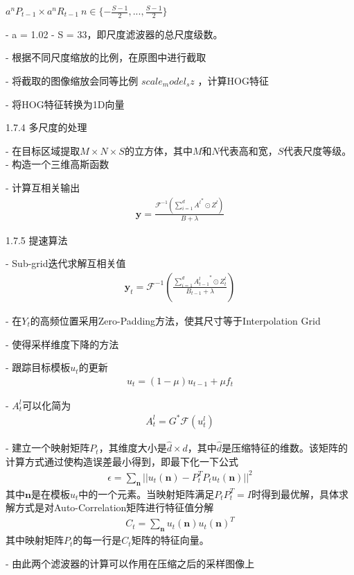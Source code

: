 $a^nP_{t-1}\times a^nR_{t-1}\ n \in \{-\frac{S-1}{2},...,\frac{S-1}{2}\} $

- a = 1.02
- S = 33，即尺度滤波器的总尺度级数。

- 根据不同尺度缩放的比例，在原图中进行截取

- 将截取的图像缩放会同等比例 $scale_model_sz$ ，计算HOG特征

- 将HOG特征转换为1D向量

1.7.4 多尺度的处理

- 在目标区域提取$M\times N \times S$的立方体，其中$M$和$N$代表高和宽，$S$代表尺度等级。
- 构造一个三维高斯函数


- 计算互相关输出
\begin{align}
\mathbf{y}=\frac{\mathcal{F}^{-1}(\sum_{i=1}^{d}{A^{l}}^*\odot Z^{l})}{B+\lambda}
\end{align}




1.7.5 提速算法

- Sub-grid迭代求解互相关值
\begin{align}
\mathbf{y}_t=\mathcal{F}^{-1}(\frac{\sum_{i=1}^{d}{A^{l}_{t-1}}^*\odot Z^{l}_{t}}{B_{t-1}+\lambda})
\end{align}

- 在$Y_t$的高频位置采用Zero-Padding方法，使其尺寸等于Interpolation Grid

- 使得采样维度下降的方法

- 跟踪目标模板$u_t$的更新
\begin{align}
u_t = (1-\mu)u_{t-1}+\mu f_t
\end{align}

- $A_t^l$可以化简为
\begin{align}
A_t^l=G^* \mathcal{F}(u_t^l)
\end{align}

- 建立一个映射矩阵$P_t$，其维度大小是$\hat{d} \times d$，其中$\hat{d}$是压缩特征的维数。该矩阵的计算方式通过使构造误差最小得到，即最下化一下公式
\begin{align}
\epsilon=\sum_\mathbf{n}||u_t(\mathbf{n})-P_t^TP_tu_t(\mathbf{n})||^2
\end{align}
其中$\mathbf{n}$是在模板$u_t$中的一个元素。当映射矩阵满足$P_tP_t^T=I$时得到最优解，具体求解方式是对Auto-Correlation矩阵进行特征值分解
\begin{align}
C_t=\sum_{\mathbf{n}}u_t(\mathbf{n})u_t(\mathbf{n})^T
\end{align}
其中映射矩阵$P_t$的每一行是$C_t$矩阵的特征向量。

- 由此两个滤波器的计算可以作用在压缩之后的采样图像上

